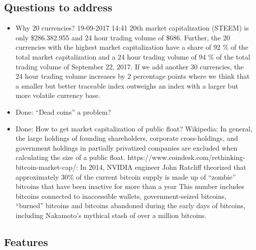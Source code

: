 \documentclass[11pt]{article}
\begin{document}
\subsection{Questions to address}
\begin{itemize}
  \item Why 20 currencies? 19-09-2017 14:41 20th market capitalization (STEEM) is only \$286.382.955 and 24 hour trading volume of \$686. Further, the 20 currencies with the highest market capitalization have a share of 92 \% of the total market capitalization and a 24 hour trading volume of 94 \% of the total trading volume of September 22, 2017. If we add another 30 currencies, the 24 hour trading volume increases by 2 percentage points where we think that a smaller but better traceable index outweighs an index with a larger but more volatile currency base.
  \item Done: ``Dead coins'' a problem?
  \item Done: How to get market capitalization of public float? Wikipedia:  In general, the large holdings of founding shareholders, corporate cross-holdings, and government holdings in partially privatized companies are excluded when calculating the size of a public float. https://www.coindesk.com/rethinking-bitcoin-market-cap/: In 2014, NVIDIA engineer John Ratcliff theorized that approximately 30\% of the current bitcoin supply is made up of ``zombie'' bitcoins that have been inactive for more than a year This number includes bitcoins connected to inaccessible wallets, government-seized bitcoins, ``burned'' bitcoins and bitcoins abandoned during the early days of bitcoins, including Nakamoto's mythical stash of over a million bitcoins.
\end{itemize}


\subsection{Features}
\end{document}
